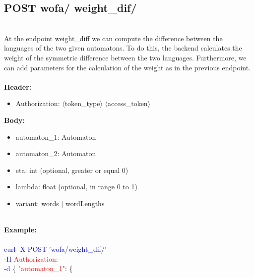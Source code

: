 \subsection{POST wofa/ weight\_dif/}
\\
At the endpoint weight\_diff we can compute the difference between the languages of the two given automatons. To do this, the backend calculates the weight of the symmetric difference between the two languages. Furthermore, we can add parameters for the calculation of the weight as in the previous endpoint. \\
\ \\
\textbf{Header:}
\begin{itemize}
    \item Authorization: $\langle$token\_type$\rangle$ $\langle$access\_token$\rangle$
\end{itemize}
\textbf{Body:}
\begin{itemize}
    \item automaton\_1: Automaton
    \item automaton\_2: Automaton
    \item eta: int (optional, greater or equal 0)
    \item lambda: float (optional, in range 0 to 1)
    \item variant: words $|$ wordLengths
\end{itemize}
\ \\
\textbf{Example:} \\
\ \\
\textcolor{blue}{curl -X POST '\BaseURL wofa/weight\_dif/'\\
-H} \textcolor{red}{Authorization}: \Auth \\
\textcolor{blue}{-d} \{ 
\textcolor{red}{"automaton\_1"}: \{ 
